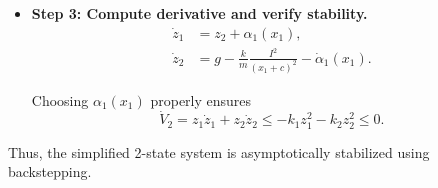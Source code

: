 \begin{example}
\begin{itemize}
    \item \textbf{Step 3: Compute derivative and verify stability.}  
    \begin{align*}
        \dot{z}_1 &= z_2 + \alpha_1(x_1), \\
        \dot{z}_2 &= g - \frac{k}{m}\frac{I^2}{(x_1+c)^2} - \dot{\alpha}_1(x_1).
    \end{align*}
    
    Choosing $\alpha_1(x_1)$ properly ensures
    \[
        \dot{V}_2 = z_1 \dot{z}_1 + z_2 \dot{z}_2 \leq - k_1 z_1^2 - k_2 z_2^2 \leq 0.
    \]

\end{itemize}

Thus, the simplified 2-state system is asymptotically stabilized using backstepping.

\end{example}





